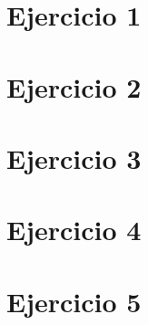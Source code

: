 







\tableofcontents
\newpage


\section{Ejercicio 1}
	\label{Ejercicio-1}
	
		
\section{Ejercicio 2}
	\label{Ejercicio-2}
		

\section{Ejercicio 3}
	\label{Ejercicio-3}
	

\section{Ejercicio 4}
	\label{Ejercicio-4}
	

\section{Ejercicio 5}
	\label{Ejercicio-5}
	
	


